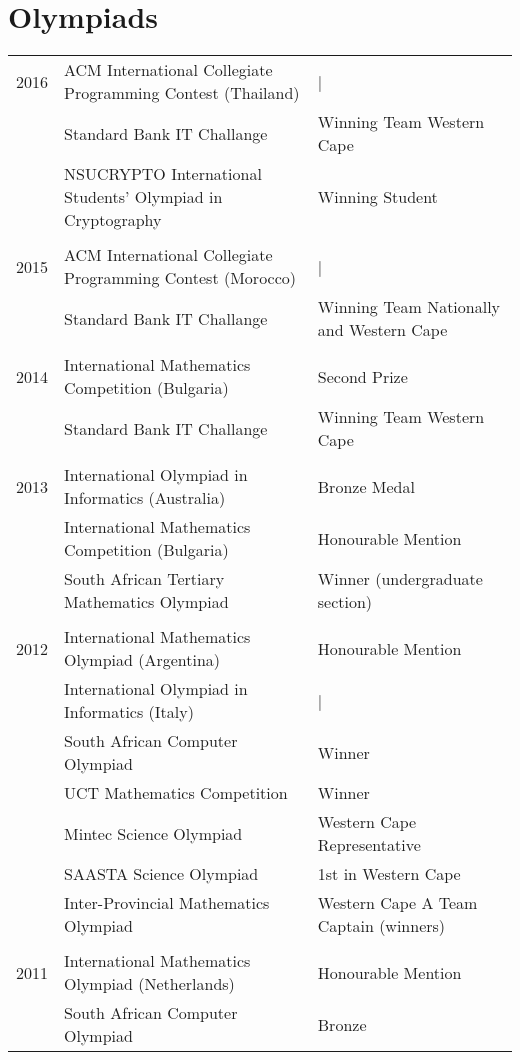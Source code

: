 \section{Olympiads}
\begin{tabular}{R{1cm}|ll}
2016 & ACM International Collegiate Programming Contest (Thailand)&|\\
& Standard Bank IT Challange & Winning Team Western Cape\\
& NSUCRYPTO International Students' Olympiad in Cryptography& Winning Student\\
&&\\
2015 & ACM International Collegiate Programming Contest (Morocco)&|\\
& Standard Bank IT Challange & Winning Team Nationally and Western Cape\\
 &&\\
  2014 & International Mathematics Competition (Bulgaria) & Second Prize\\
& Standard Bank IT Challange & Winning Team Western Cape\\
&&\\
2013 & International Olympiad in Informatics (Australia)& Bronze Medal\\
     & International Mathematics Competition (Bulgaria)& Honourable Mention\\
& South African Tertiary Mathematics Olympiad & Winner (undergraduate section)\\
&&\\
2012 & International Mathematics Olympiad (Argentina) & Honourable Mention\\
   & International Olympiad in Informatics (Italy)&|\\
& South African Computer Olympiad& Winner\\
& UCT Mathematics Competition & Winner\\
& Mintec Science Olympiad&Western Cape Representative\\
& SAASTA Science Olympiad&1st in Western Cape\\
& Inter-Provincial Mathematics Olympiad&Western Cape A Team Captain (winners)\\
&&\\
2011 & International Mathematics Olympiad (Netherlands)& Honourable Mention\\
& South African Computer Olympiad& Bronze\\

\end{tabular}
